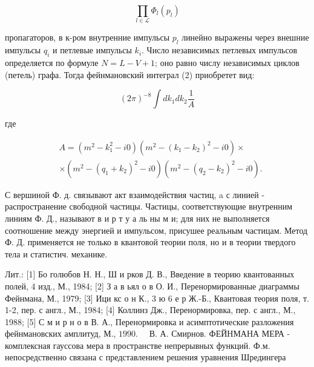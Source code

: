 \documentclass[10pt]{article}
\begin{document}
\[

\prod_{l \in \mathscr{L}} \Phi_{l}\left(p_{l}\right)

\]



пропагаторов, в к-ром внутренние импульсы $p_{l}$ линейно выражены через внешние импульсы $q_{i}$ и петлевые импульсы $k_{i}$. Число независимых петлевых импульсов определяется по формуле $N=L-V+1$; оно равно числу независимых циклов (петель) графа. Тогда фейнмановский интеграл (2) приобретет вид:



\[

(2 \pi)^{-8} \int d k_{1} d k_{2} \frac{1}{A}

\]



где



\[

\begin{aligned}

& A=\left(m^{2}-k_{1}^{2}-i 0\right)\left(m^{2}-\left(k_{1}-k_{2}\right)^{2}-i 0\right) \times \\

& \times\left(m^{2}-\left(q_{1}+k_{2}\right)^{2}-i 0\right)\left(m^{2}-\left(q_{2}-k_{2}\right)^{2}-i 0\right) .

\end{aligned}

\]



С вершиной Ф. д. связывают акт взаимодействия частиц, a с линией - распространение свободной частицы. Частицы, соответствующие внутренним линиям Ф. Д., называют в и р т у а ль ны м и; для них не выполняется соотношение между энергией и импульсом, присушее реальным частицам. Метод Ф. Д. применяется не только в квантовой теории поля, но и в теории твердого тела и статистич. механике.



Лит.: [1] Бо голюбов Н. Н., Ш и рков Д. В., Введение в теорию квантованных полей, 4 изд., М., 1984; [2] З а в ьял о в О. И., Перенормированные диаграммы Фейнмана, М., 1979; [3] Ици кс о н К., 3 ю 6 е р Ж.-Б., Квантовая теория поля, т. 1-2, пер. с англ., М., 1984; [4] Коллинз Дж., Перенормировка, пер. с англ., М., 1988; [5] С м и р н о в В. А., Перенормировка и асимптотические разложения фейнмановских амплитуд, М., $1990 . \quad$ В. А. Смирнов. ФЕЙНМАНА МЕРА - комплексная гауссова мера в пространстве непрерывных функций. Ф.м. непосредственно связана с представлением решения уравнения Шредингера
\end{document}
